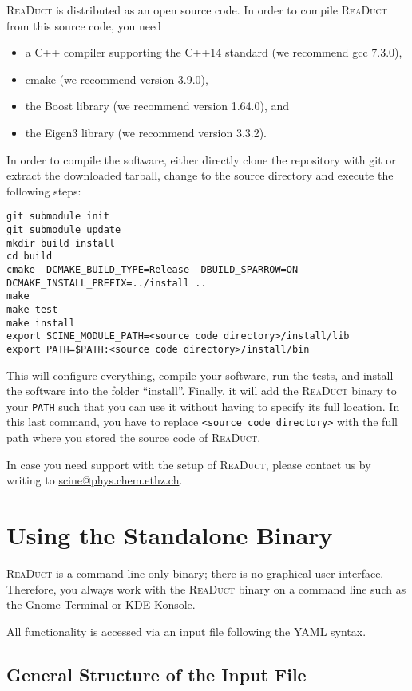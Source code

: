 \documentclass[]{tufte-book}
\begin{document}
\textsc{ReaDuct} is distributed as an open source code. In order to compile \textsc{ReaDuct} from this source code, you need
\begin{itemize}
 \item a C++ compiler supporting the C++14 standard (we recommend gcc 7.3.0),
 \item cmake (we recommend version 3.9.0),
 \item the Boost library (we recommend version 1.64.0), and
 \item the Eigen3 library (we recommend version 3.3.2).
\end{itemize}
In order to compile the software, either directly clone the repository with git or extract the downloaded tarball, change 
to the source directory and execute the following steps:
\begin{verbatim}
git submodule init
git submodule update
mkdir build install
cd build
cmake -DCMAKE_BUILD_TYPE=Release -DBUILD_SPARROW=ON -DCMAKE_INSTALL_PREFIX=../install ..
make
make test
make install
export SCINE_MODULE_PATH=<source code directory>/install/lib
export PATH=$PATH:<source code directory>/install/bin
\end{verbatim}
This will configure everything, compile your software, run the tests, and install the software 
into the folder ``install''. Finally, it will add the \textsc{ReaDuct} binary to your \texttt{PATH} such that you can use
it without having to specify its full location. In this last command, you have to replace \texttt{<source code directory>}
with the full path where you stored the source code of \textsc{ReaDuct}.

In case you need support with the setup of \textsc{ReaDuct}, please contact us by writing to \href{scine@phys.chem.ethz.ch}{scine@phys.chem.ethz.ch}.



\chapter{Using the Standalone Binary}

\textsc{ReaDuct} is a command-line-only binary; there is no graphical user interface. Therefore, you always work with the
\textsc{ReaDuct} binary on a command line such as the Gnome Terminal or KDE Konsole.

All functionality is accessed via an input file following the YAML syntax. 


\section{General Structure of the Input File}
\end{document}
